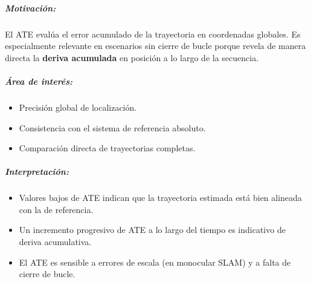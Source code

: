 \documentclass[12pt, a4paper, twoside]{article}
\begin{document}
\subparagraph{Motivación:}
El ATE\cite{Chen2022DELOATE} evalúa el error acumulado de la trayectoria en coordenadas globales.
Es especialmente relevante en escenarios sin cierre de bucle porque 
revela de manera directa la \textbf{deriva acumulada} en posición a lo largo de la secuencia.

\subparagraph{Área de interés:}
\begin{itemize}
  \item Precisión global de localización.
  \item Consistencia con el sistema de referencia absoluto.
  \item Comparación directa de trayectorias completas.
\end{itemize}

\subparagraph{Interpretación:}
\begin{itemize}
  \item Valores bajos de ATE\cite{Chen2022DELOATE} indican que la trayectoria estimada está bien alineada con la de referencia.
  \item Un incremento progresivo de ATE\cite{Chen2022DELOATE} a lo largo del tiempo es indicativo de deriva acumulativa.
  \item El ATE\cite{Chen2022DELOATE} es sensible a errores de escala (en monocular SLAM\cite{smith1987slam}) y a falta de cierre de bucle.
\end{itemize}
\end{document}
